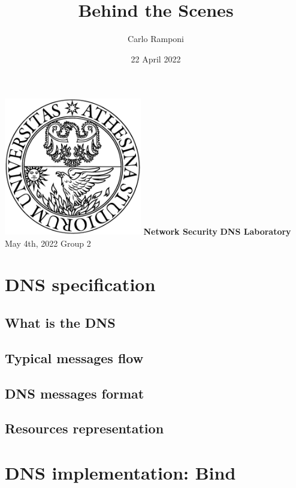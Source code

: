 \documentclass[11pt,a4paper]{article}
\title{Behind the Scenes}
\author{Carlo Ramponi}
\date{22 April 2022}
\begin{document}
\begin{titlepage}

\centering
    \vfill
    \vskip3cm
    \includegraphics[width=6cm]{logo_unitn.png}
    \vfill
    \textbf{\Huge Network Security}
    \vskip1cm
    \textbf{\LARGE DNS Laboratory}
    \vskip1cm
    \large May 4th, 2022
    \vskip2cm
    \Large Group 2
    \vfill

\end{titlepage}

\clearpage

\tableofcontents

\clearpage

\section{DNS specification}

\subsection{What is the DNS}

\subsection{Typical messages flow}

\subsection{DNS messages format}

\subsection{Resources representation}

\section{DNS implementation: Bind}
\end{document}
